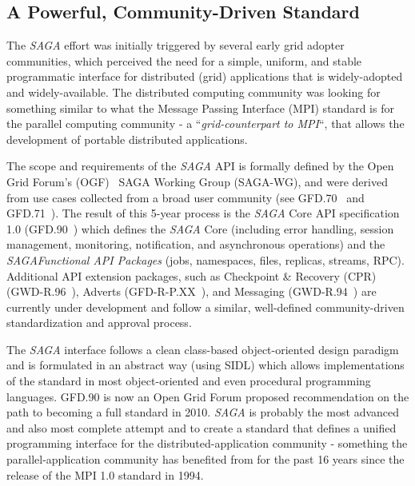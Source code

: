 \documentclass[a4paper,10pt]{article}
\newcommand{\sagaspec}{\textit{SAGA}\xspace}
\newcommand{\spec}{\sagaspec}
\begin{document}
\vspace{-0.8em}

\subsection*{A Powerful, Community-Driven Standard}
\vspace{-0.5em}
 The \spec effort was initially triggered by several early grid adopter communities, which perceived the need for a simple, uniform, and stable programmatic interface for distributed (grid) applications that is widely-adopted and widely-available. The distributed computing community was looking for something similar to what the Message Passing Interface (MPI) standard is for the parallel computing community - a ``\textit{grid-counterpart to MPI}``, that allows the development of portable distributed applications.
 
 
 The scope and requirements of the \spec API is
 formally defined by the Open Grid Forum's (OGF)~\cite{ogf} SAGA Working Group (SAGA-WG), and were
 derived from use cases collected from a broad user community (see
 GFD.70~\cite{ogf-gfd-70} and GFD.71~\cite{ogf-gfd-71}). The result
 of this 5-year process is the \spec Core API
 specification 1.0 (GFD.90~\cite{ogf-gfd-90}) which defines the \spec
 Core (including error handling, session management, monitoring,
 notification, and asynchronous operations) and the \spec \textit{Functional API
 Packages} (jobs, namespaces, files, replicas, streams, RPC).
  Additional API extension packages, such as
 Checkpoint \& Recovery (CPR) (GWD-R.96~\cite{ogf-gwd-r-96}), Adverts
 (GFD-R-P.XX~\cite{ogf-gwd-r-p-xx}), and Messaging
 (GWD-R.94~\cite{ogf-gwd-r-94}) are currently under development and
 follow a similar, well-defined community-driven standardization and
 approval process. 

 
The \spec interface follows a clean class-based object-oriented design paradigm and is 
 formulated in an abstract way (using SIDL) which allows implementations of the standard in
 most object-oriented and even procedural programming languages. GFD.90 is now an Open Grid Forum proposed recommendation on the path to becoming a full standard in 2010. \spec is probably the most advanced and also most complete attempt and to create a standard that defines a unified programming interface for the distributed-application community - something the parallel-application community has benefited from for the past 16 years since the release of the MPI 1.0 standard in 1994. 
 
\end{document}
